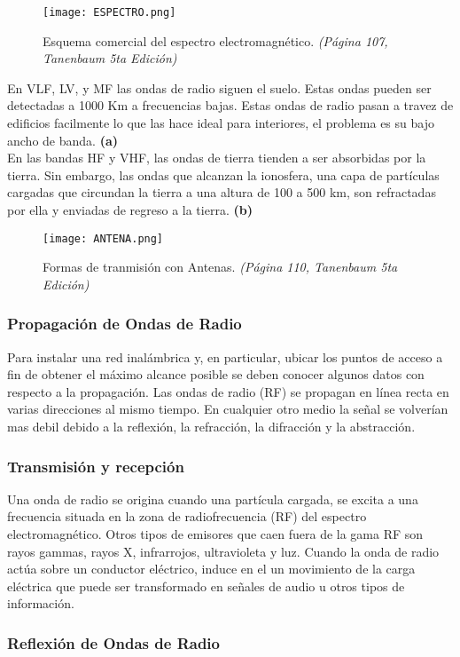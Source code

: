 \begin{figure}[H]
\centering
\texttt{[image: ESPECTRO.png]}
\caption{Esquema comercial del espectro electromagnético. \textit{(Página 107, Tanenbaum 5ta Edición)}}
\end{figure}
En VLF, LV, y MF las ondas de radio siguen el suelo. Estas ondas pueden ser detectadas a 1000 Km a frecuencias bajas. Estas ondas de radio pasan a travez de edificios facilmente lo que las hace ideal para interiores, el problema es su bajo ancho de banda. \textbf{(a)}
\\
En las bandas HF y VHF, las ondas de tierra tienden a ser absorbidas por la tierra. Sin embargo, las ondas que alcanzan la ionosfera, una capa de partículas cargadas que circundan la tierra a una altura de 100 a 500 km, son refractadas por ella y enviadas de regreso a la tierra. \textbf{(b)}

\begin{figure}[H]
\centering
\texttt{[image: ANTENA.png]}
\caption{Formas de tranmisión con Antenas. \textit{(Página 110, Tanenbaum 5ta Edición)}}
\end{figure}

\subsubsection*{Propagación de Ondas de Radio}

Para instalar una red inalámbrica y, en particular, ubicar los puntos de acceso a fin de obtener el máximo alcance posible se deben conocer algunos datos con respecto a la propagación. Las ondas de radio (RF) se propagan en línea recta en varias direcciones al mismo tiempo. En cualquier otro medio la señal se volverían mas debil debido a la reflexión, la refracción, la difracción y la abstracción.

\subsubsection*{Transmisión y recepción}
Una onda de radio se origina cuando una partícula cargada, se excita a una frecuencia situada en la zona de radiofrecuencia (RF) del espectro electromagnético. Otros tipos de emisores que caen fuera de la gama RF son rayos gammas, rayos X, infrarrojos, ultravioleta y luz. Cuando la onda de radio actúa sobre un conductor eléctrico, induce en el un movimiento de la carga eléctrica que puede ser transformado en señales de audio u otros tipos de información.

\subsubsection*{Reflexión de Ondas de Radio}

